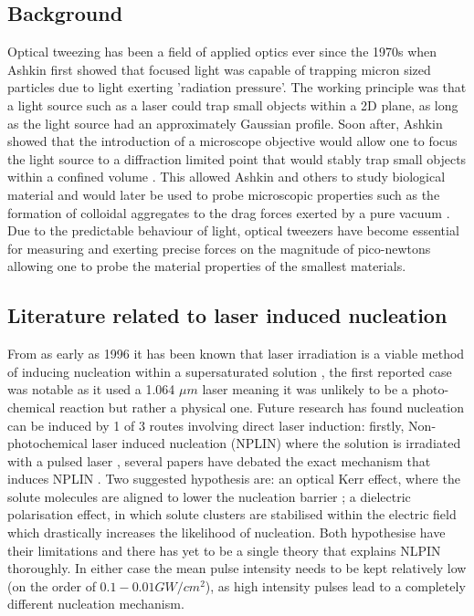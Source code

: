 \subsection{Background}
Optical tweezing has been a field of applied optics ever since the 1970s
when Ashkin \cite{Ashkin1970} first showed that focused light was capable 
of trapping micron sized particles due to light exerting 'radiation pressure'. 
The working principle was that a light source such as a laser could trap 
small objects within a 2D plane, as long as the light source had an 
approximately Gaussian profile. Soon after, Ashkin showed that the introduction 
of a microscope objective would allow one to focus the light source to a 
diffraction limited point that would stably trap small objects within a 
confined volume \cite{Ashkin1980}. This allowed Ashkin and others to study 
biological material and would later be used to probe microscopic properties 
such as the formation of colloidal aggregates \cite{Yi2021} to the drag 
forces exerted by a pure vacuum \cite{Ahn2018, Monteiro2018}. Due to the 
predictable behaviour of light, optical tweezers have become essential for 
measuring and exerting precise forces on the magnitude of pico-newtons 
allowing one to probe the material properties of the smallest materials. 

\subsection{Literature related to laser induced nucleation}
From as early as 1996 it has been known that laser irradiation is a viable
method of inducing nucleation within a supersaturated solution \cite{Garetz1996}, 
the first reported case was notable as it used a 1.064 $\mu m$ laser meaning 
it was unlikely to be a photo-chemical reaction but rather a physical one. 
Future research has found nucleation can be induced by 1 of 3 routes involving 
direct laser induction: firstly, Non-photochemical laser induced nucleation 
(NPLIN) where the solution is irradiated with a pulsed laser \cite{Garetz1996,
Garetz2002,Sun2006}, several papers have debated the exact mechanism that 
induces NPLIN \cite{Garetz2002, Knott2011}. Two suggested hypothesis are: 
an optical Kerr effect, where the solute molecules are aligned to lower the 
nucleation barrier \cite{Knott2011}; a dielectric polarisation effect, in 
which solute clusters are stabilised within the electric field which drastically 
increases the likelihood of nucleation\cite{Alexander2008}. Both hypothesise 
have their limitations and there has yet to be a single theory that explains 
NLPIN thoroughly. In either case the mean pulse intensity needs to be kept 
relatively low (on the order of $0.1-0.01 GW/cm^2$), as high intensity pulses 
lead to a completely different nucleation mechanism.

